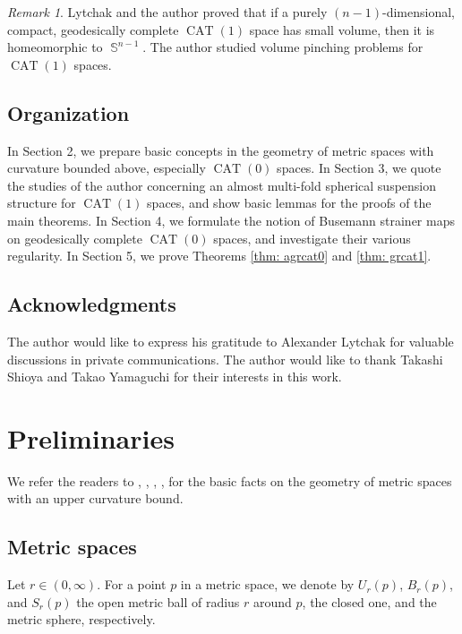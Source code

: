 \documentclass[a4paper,12pt]{amsart}
\newcommand{\CAT}{\operatorname{CAT}}
\newcommand{\Sph}{\operatorname{\mathbb{S}}}
\numberwithin{equation}{section}
\theoremstyle{plain}
\theoremstyle{definition}
\theoremstyle{remark}
\newtheorem{rem}{Remark}[section]
\begin{document}
\begin{rem}
Lytchak and the author \cite[Theorem 8.3]{lytchak-nagano2}
proved that 
if a purely $(n-1)$-dimensional,
compact, geodesically complete $\CAT(1)$ space 
has small volume,
then it is homeomorphic to $\Sph^{n-1}$.
The author \cite{nagano4} studied volume pinching problems 
for $\CAT(1)$ spaces.
\end{rem}

\subsection{Organization}

In Section 2,
we prepare basic concepts in the geometry 
of metric spaces with curvature bounded above,
especially $\CAT(0)$ spaces.
In Section 3,
we quote the studies of the author \cite{nagano6}
concerning an almost multi-fold spherical suspension structure
for $\CAT(1)$ spaces,
and show basic lemmas for the proofs of the main theorems.
In Section 4,
we formulate the notion of Busemann strainer maps on 
geodesically complete $\CAT(0)$ spaces,
and investigate their various regularity.
In Section 5,
we prove Theorems \ref{thm: agrcat0} and \ref{thm: grcat1}.

\subsection*{Acknowledgments}

The author would like to express his gratitude to
Alexander Lytchak for valuable discussions 
in private communications.
The author would like to thank
Takashi Shioya and Takao Yamaguchi
for their interests in this work.

\section{Preliminaries}

We refer the readers to 
\cite{alexander-kapovitch-petrunin-0},
\cite{alexander-kapovitch-petrunin}, 
\cite{ballmann}, \cite{bridson-haefliger}, \cite{burago-burago-ivanov}
for the basic facts
on the geometry of
metric spaces with an upper curvature bound.

\subsection{Metric spaces}

Let $r \in (0,\infty)$.
For a point $p$ in a metric space,
we denote by $U_r(p)$, $B_r(p)$, and $S_r(p)$
the open metric ball of radius $r$ around $p$,
the closed one, and the metric sphere, respectively.
\end{document}
